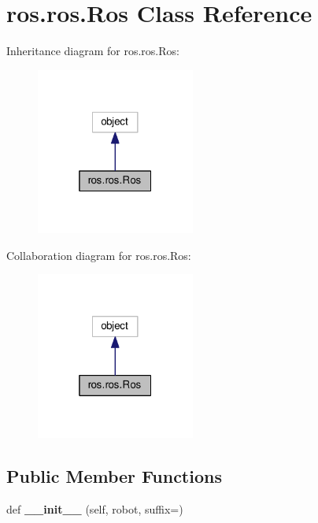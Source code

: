 \hypertarget{classros_1_1ros_1_1Ros}{}\section{ros.\+ros.\+Ros Class Reference}
\label{classros_1_1ros_1_1Ros}


Inheritance diagram for ros.\+ros.\+Ros\+:
\nopagebreak
\begin{figure}[H]
\begin{center}
\leavevmode
\includegraphics[width=148pt]{classros_1_1ros_1_1Ros__inherit__graph}
\end{center}
\end{figure}


Collaboration diagram for ros.\+ros.\+Ros\+:
\nopagebreak
\begin{figure}[H]
\begin{center}
\leavevmode
\includegraphics[width=148pt]{classros_1_1ros_1_1Ros__coll__graph}
\end{center}
\end{figure}
\subsection*{Public Member Functions}
\begin{DoxyCompactItemize}
\item 
def {\bfseries \+\_\+\+\_\+init\+\_\+\+\_\+} (self, robot, suffix=\textquotesingle{}\textquotesingle{})\hypertarget{classros_1_1ros_1_1Ros_afc21e7cd18df42d888198438e6a0fe6d}{}\label{classros_1_1ros_1_1Ros_afc21e7cd18df42d888198438e6a0fe6d}

\end{DoxyCompactItemize}
